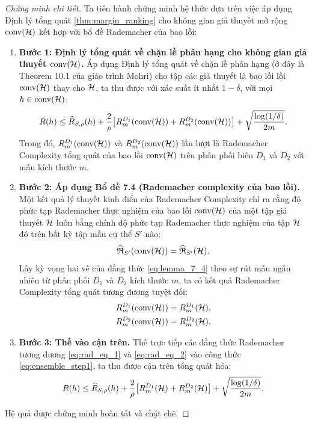 \begin{proof}[Chứng minh chi tiết]
Ta tiến hành chứng minh hệ thức dựa trên việc áp dụng Định lý tổng quát \ref{thm:margin_ranking} cho không gian giả thuyết mở rộng $\operatorname{conv}(\mathcal{H})$ kết hợp với bổ đề Rademacher của bao lồi:

\begin{enumerate}
    \item \textbf{Bước 1: Định lý tổng quát về chặn lề phân hạng cho không gian giả thuyết $\operatorname{conv}(\mathcal{H})$.}
    Áp dụng Định lý tổng quát về chặn lề phân hạng (ở đây là Theorem 10.1 của giáo trình Mohri) cho tập các giả thuyết là bao lồi lồi $\operatorname{conv}(\mathcal{H})$ thay cho $\mathcal{H}$, ta thu được với xác suất ít nhất $1 - \delta$, với mọi $h \in \operatorname{conv}(\mathcal{H})$:
    \begin{equation}
        R(h) \leq \widehat{R}_{S,\rho}(h) + \frac{2}{\rho}\bigl[R^{D_1}_m(\operatorname{conv}(\mathcal{H})) + R^{D_2}_m(\operatorname{conv}(\mathcal{H}))\bigr] + \sqrt{\frac{\log(1/\delta)}{2m}}.
        \label{eq:ensemble_step1}
    \end{equation}
    Trong đó, $R^{D_1}_m(\operatorname{conv}(\mathcal{H}))$ và $R^{D_2}_m(\operatorname{conv}(\mathcal{H}))$ lần lượt là Rademacher Complexity tổng quát của bao lồi $\operatorname{conv}(\mathcal{H})$ trên phân phối biên $D_1$ và $D_2$ với mẫu kích thước $m$.
    
    \item \textbf{Bước 2: Áp dụng Bổ đề 7.4 (Rademacher complexity của bao lồi).}
    Một kết quả lý thuyết kinh điển của Rademacher Complexity chỉ ra rằng độ phức tạp Rademacher thực nghiệm của bao lồi $\operatorname{conv}(\mathcal{H})$ của một tập giả thuyết $\mathcal{H}$ luôn bằng chính độ phức tạp Rademacher thực nghiệm của tập $\mathcal{H}$ đó trên bất kỳ tập mẫu cụ thể $S'$ nào:
    \begin{equation}
        \widehat{\mathfrak{R}}_{S'}(\operatorname{conv}(\mathcal{H})) = \widehat{\mathfrak{R}}_{S'}(\mathcal{H}).
        \label{eq:lemma_7_4}
    \end{equation}
    Lấy kỳ vọng hai vế của đẳng thức \eqref{eq:lemma_7_4} theo sự rút mẫu ngẫu nhiên từ phân phối $D_1$ và $D_2$ kích thước $m$, ta có kết quả Rademacher Complexity tổng quát tương đương tuyệt đối:
    \begin{align}
        R^{D_1}_m(\operatorname{conv}(\mathcal{H})) &= R^{D_1}_m(\mathcal{H}), \label{eq:rad_eq_1} \\
        R^{D_2}_m(\operatorname{conv}(\mathcal{H})) &= R^{D_2}_m(\mathcal{H}). \label{eq:rad_eq_2}
    \end{align}
    
    \item \textbf{Bước 3: Thế vào cận trên.}
    Thế trực tiếp các đẳng thức Rademacher tương đương \eqref{eq:rad_eq_1} và \eqref{eq:rad_eq_2} vào công thức \eqref{eq:ensemble_step1}, ta thu được cận trên tổng quát hóa:
    \[
        R(h) \leq \widehat{R}_{S,\rho}(h) + \frac{2}{\rho}\bigl[R^{D_1}_m(\mathcal{H}) + R^{D_2}_m(\mathcal{H})\bigr] + \sqrt{\frac{\log(1/\delta)}{2m}}.
    \]
\end{enumerate}
Hệ quả được chứng minh hoàn tất và chặt chẽ.
\end{proof}

